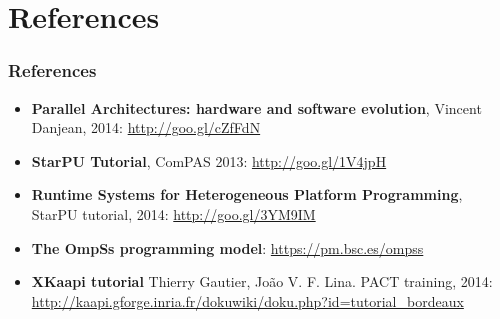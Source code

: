 \section*{References}

\begin{frame}
  \frametitle{References}
  \begin{itemize}\footnotesize
  \item {\bf Parallel Architectures: hardware and software evolution}, Vincent Danjean, 2014: 
    \url{http://goo.gl/cZfFdN}
  \item {\bf StarPU Tutorial},  ComPAS 2013: \url{http://goo.gl/1V4jpH}
  \item {\bf Runtime Systems for Heterogeneous Platform Programming}, StarPU tutorial, 2014: \url{http://goo.gl/3YM9IM}
  \item {\bf The OmpSs programming model}: \url{https://pm.bsc.es/ompss}
  \item {\bf XKaapi tutorial} Thierry Gautier, João V. F. Lina. PACT training, 2014:
    \url{http://kaapi.gforge.inria.fr/dokuwiki/doku.php?id=tutorial_bordeaux}
  \end{itemize}
\end{frame}
